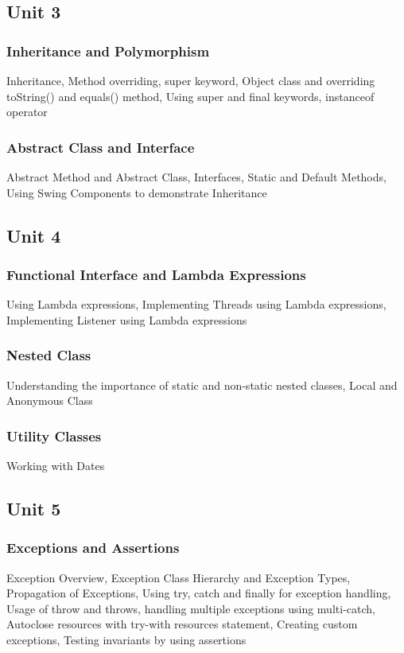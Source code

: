 \documentclass{article}
\begin{document}
\begin{multicols*}{2}
    \subsection*{Unit 3}
    \subsubsection*{Inheritance and Polymorphism}
    Inheritance, Method overriding, super keyword, Object class and overriding toString() and equals() method, Using super and final keywords, instanceof operator
    \subsubsection*{Abstract Class and Interface}
    Abstract Method and Abstract Class, Interfaces, Static and Default Methods, Using Swing Components to demonstrate Inheritance
    \subsection*{Unit 4}
    \subsubsection*{Functional Interface and Lambda Expressions}
    Using Lambda expressions, Implementing Threads using Lambda expressions, Implementing Listener using Lambda expressions
    \subsubsection*{Nested Class}
    Understanding the importance of static and non-static nested classes, Local and Anonymous Class
    \subsubsection*{Utility Classes}
    Working with Dates
    \subsection*{Unit 5}
    \subsubsection*{Exceptions and Assertions}
    Exception Overview, Exception Class Hierarchy and Exception Types, Propagation of Exceptions, Using try, catch and finally for exception handling, Usage of throw and throws, handling multiple exceptions using multi-catch, Autoclose resources with try-with resources statement, Creating custom exceptions, Testing invariants by using assertions

\end{multicols*}
\end{document}
